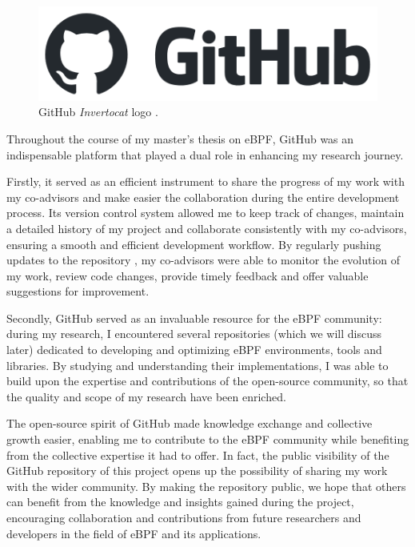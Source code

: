 \begin{figure}[h]
	\centering
	\includegraphics[width=0.7\linewidth]{images/Technologies/GitHub_logo.png}
	\caption{GitHub \textit{Invertocat} logo \cite{GitHubLogo}.}
	\label{fig:GitHub_logo}
\end{figure}

Throughout the course of my master's thesis on eBPF, GitHub was an indispensable platform that played a dual role in enhancing my research journey. 

Firstly, it served as an efficient instrument to share the progress of my work with my  co-advisors and make easier the collaboration during the entire development process. 
Its version control system allowed me to keep track of changes, maintain a detailed history of my project and collaborate consistently with my co-advisors, ensuring a smooth and efficient development workflow. 
By regularly pushing updates to the repository \cite{MasterThesisRepo}, my co-advisors were able to monitor the evolution of my work, review code changes, provide timely feedback and offer valuable suggestions for improvement.

Secondly, GitHub served as an invaluable resource for the eBPF community: during my research, I encountered several repositories (which we will discuss later) dedicated to developing and optimizing eBPF environments, tools and libraries. 
By studying and understanding their implementations, I was able to build upon the expertise and contributions of the open-source community, so that the quality and scope of my research have been enriched.

The open-source spirit of GitHub made knowledge exchange and collective growth easier, enabling me to contribute to the eBPF community while benefiting from the collective expertise it had to offer.
In fact, the public visibility of the GitHub repository of this project opens up the possibility of sharing my work with the wider community. 
By making the repository public, we hope that others can benefit from the knowledge and insights gained during the project, encouraging collaboration and contributions from future researchers and developers in the field of eBPF and its applications.

